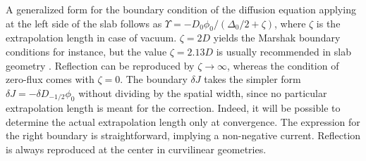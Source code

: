 \documentclass{ictt26}
\begin{document}
A generalized form for the boundary condition of the diffusion equation applying at the left side of the slab follows as $\Upsilon = - D_0 \phi_0 / (\Delta_0 / 2 + \zeta)$, where $\zeta$ is the extrapolation length in case of vacuum. $\zeta = 2D$ yields the Marshak boundary conditions for instance, but the value $\zeta = 2.13D$ is usually recommended in slab geometry \cite{stamm1983methods}. Reflection can be reproduced by $\zeta \rightarrow \infty$, whereas the condition of zero-flux comes with $\zeta = 0$. The boundary $\delta J$ takes the simpler form $\delta J = - \delta D_{-1/2} \phi_0$ without dividing by the spatial width, since no particular extrapolation length is meant for the correction. Indeed, it will be possible to determine the actual extrapolation length only at convergence. The expression for the right boundary is straightforward, implying a non-negative current. Reflection is always reproduced at the center in curvilinear geometries.
\end{document}

